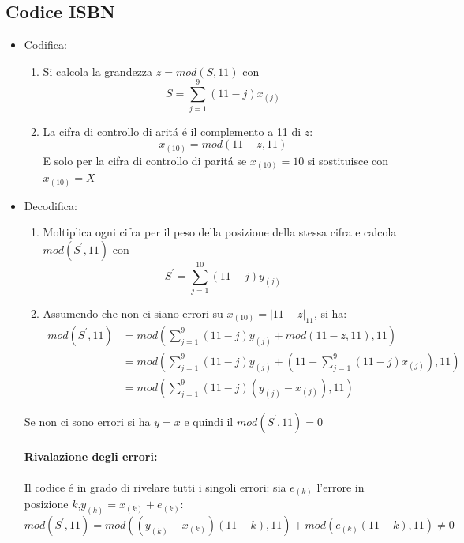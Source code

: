     \subsection{Codice ISBN}
        \begin{itemize}
            \item {Codifica:
                \begin{enumerate}
                    \item {
                        Si calcola la grandezza $z = mod(S,11)$ con
                        \[
                            S = \sum_{j=1}^{9} (11-j)x_{(j)}
                        \]
                    }
                    \item {
                        La cifra di controllo di aritá é il complemento a 11 di $z$:
                        \[
                            x_{(10)} = mod(11-z,11)  
                        \]
                        E solo per la cifra di controllo di paritá se $x_{(10)} = 10$ si sostituisce con 
                        $x_{(10)} = X$
                    }
                \end{enumerate} 
            }
            \item {Decodifica:
                \begin{enumerate}
                    \item {
                        Moltiplica ogni cifra per il peso della posizione della stessa cifra e calcola $mod(S^\prime,11)$ con
                        \[
                            S^\prime = \sum_{j=1}^{10} (11-j)y_{(j)}
                        \]
                    }
                    \item {
                        Assumendo che non ci siano errori su $x_{(10)} = |11-z|_{11}$, si ha:
                        \begin{align}
                            mod(S^\prime,11) &= mod \left( \sum_{j=1}^{9} (11-j)y_{(j)} + mod(11-z,11),11\right) \nonumber \\
                                            &= mod \left( \sum_{j=1}^{9} (11-j)y_{(j)} + \left(11-\sum_{j=1}^{9} (11-j)x_{(j)}\right),11\right)\nonumber \\
                                            &= mod \left(\sum_{j=1}^{9} (11-j)(y_{(j)}-x_{(j)}),11\right)
                        \end{align}
                    }
                \end{enumerate}
                Se non ci sono errori si ha $y=x$ e quindi il $mod(S^\prime,11) = 0$
                \paragraph{Rivalazione degli errori:} Il codice é in grado di rivelare tutti i singoli errori:
                sia $e_{(k)}$ l'errore in posizione $k$,$y_{(k)} = x_{(k)}+ e_{(k)}$:
                \[
                    mod(S^\prime,11) = mod((y_{(k)}-x_{(k)})(11-k),11)+mod(e_{(k)}(11-k),11) \neq 0
                \]
            }
        \end{itemize}
